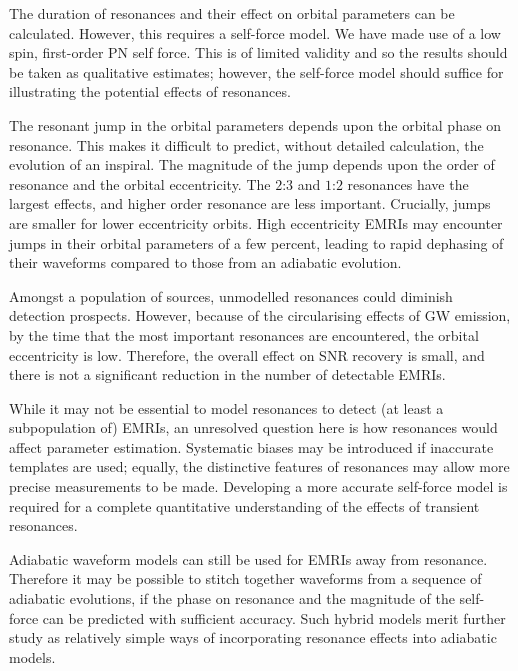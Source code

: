 \documentclass[aps,prd,amsfonts,amssymb,amsmath,nofootinbib,showpacs,superscriptaddress,twocolumn,floatfix]{revtex4-1}
\begin{document}
The duration of resonances and their effect on orbital parameters can be calculated. However, this requires a self-force model. We have made use of a low spin, first-order PN self force. This is of limited validity and so the results should be taken as qualitative estimates; however, the self-force model should suffice for illustrating the potential effects of resonances.

The resonant jump in the orbital parameters depends upon the orbital phase on resonance. This makes it difficult to predict, without detailed calculation, the evolution of an inspiral. The magnitude of the jump depends upon the order of resonance and the orbital eccentricity. The $2$:$3$ and $1$:$2$ resonances have the largest effects, and higher order resonance are less important. Crucially, jumps are smaller for lower eccentricity orbits. High eccentricity EMRIs may encounter jumps in their orbital parameters of a few percent, leading to rapid dephasing of their waveforms compared to those from an adiabatic evolution.

Amongst a population of sources, unmodelled resonances could diminish detection prospects. However, because of the circularising effects of GW emission, by the time that the most important resonances are encountered, the orbital eccentricity is low. Therefore, the overall effect on SNR recovery is small, and there is not a significant reduction in the number of detectable EMRIs.

While it may not be essential to model resonances to detect (at least a subpopulation of) EMRIs, an unresolved question here is how resonances would affect parameter estimation. Systematic biases may be introduced if inaccurate templates are used; equally, the distinctive features of resonances may allow more precise measurements to be made. Developing a more accurate self-force model is required for a complete quantitative understanding of the effects of transient resonances.

Adiabatic waveform models can still be used for EMRIs away from resonance. Therefore it may be possible to stitch together waveforms from a sequence of adiabatic evolutions, if the phase on resonance and the magnitude of the self-force can be predicted with sufficient accuracy. Such hybrid models merit further study as relatively simple ways of incorporating resonance effects into adiabatic models.
\end{document}
